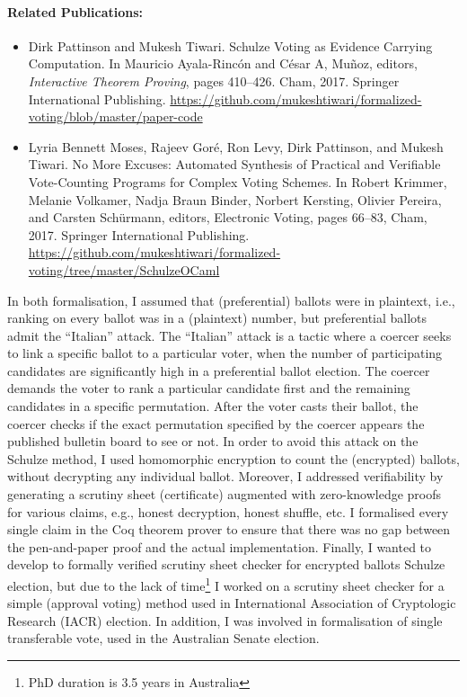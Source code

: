\documentclass[a4paper]{article}
\begin{document}
\paragraph{Related Publications:}
\begin{itemize}
    \item {Dirk Pattinson and Mukesh Tiwari.} {Schulze Voting as Evidence Carrying Computation}. 
    {In Mauricio Ayala-Rinc{\'o}n 
    and C{\'e}sar A, Mu{\~{n}}oz, editors, \textit{Interactive Theorem Proving}, pages 410--426.
    Cham, 2017. Springer International Publishing.}
    {\url{https://github.com/mukeshtiwari/formalized-voting/blob/master/paper-code}}
    \item {Lyria Bennett Moses, Rajeev Gor{\'e}, Ron Levy, Dirk Pattinson, and Mukesh Tiwari.}
    {No More Excuses: Automated Synthesis of Practical and Verifiable Vote-Counting Programs for Complex Voting Schemes.}
    {In Robert Krimmer, Melanie Volkamer, Nadja Braun Binder, Norbert Kersting, Olivier Pereira, and Carsten Sch{\"u}rmann, 
    editors, Electronic Voting, pages 66--83, Cham, 2017. Springer International Publishing.}
    {\url{https://github.com/mukeshtiwari/formalized-voting/tree/master/SchulzeOCaml}}
\end{itemize}

In both formalisation, I assumed that (preferential) ballots were in plaintext, i.e., 
ranking on every ballot was in a (plaintext) number, but preferential ballots 
admit the ``Italian'' attack. The ``Italian'' attack is a tactic where a coercer 
seeks to link a specific ballot 
to a particular voter, when the number of participating candidates 
are significantly high in a preferential ballot election. 
The coercer demands the voter to rank a particular 
candidate first and the remaining candidates in a specific permutation. After the 
voter casts their ballot, the coercer checks if 
the exact permutation specified by the coercer appears the published bulletin board to see or not.
In order to
avoid this attack on the Schulze method, I used homomorphic encryption to count the (encrypted) 
ballots, without decrypting any individual ballot. Moreover, I addressed verifiability
by generating a scrutiny sheet (certificate) augmented with zero-knowledge proofs for 
various claims, e.g., honest decryption, honest shuffle, etc. 
I formalised every single 
claim in the Coq theorem prover to ensure that there was no gap between 
the pen-and-paper proof and the actual implementation. 
Finally, I wanted to develop to formally 
verified scrutiny sheet checker for encrypted ballots Schulze election, but due to the lack of 
time\footnote{PhD duration is 3.5 years in Australia} I worked on a scrutiny sheet checker for a 
simple (approval voting) method used in
International Association of Cryptologic Research (IACR) election.
In addition, I was involved in formalisation of single transferable vote, used in 
the Australian Senate election.
\end{document}
